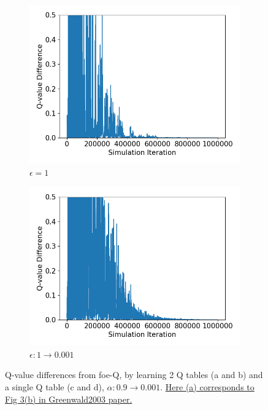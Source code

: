 \documentclass[10pt]{article}
\begin{document}
\begin{figure}[H]
\begin{subfigure}[b]{0.245\linewidth}
  \centering
  \includegraphics[width=\linewidth]{../figs/Qdifference_11.png}
      \caption{$\epsilon=1$}
  \label{fig:foeQ_1Q_1}
  \end{subfigure}
  \begin{subfigure}[b]{0.245\linewidth}
  \centering
  \includegraphics[width=\linewidth]{../figs/Qdifference_7.png}
      \caption{$\epsilon:1\rightarrow0.001$}
  \label{fig:foeQ_1Q_0001}
  \end{subfigure}
  \caption{Q-value differences from foe-Q, by learning 2 Q tables (a and b) and a single Q table (c and d), $\alpha:0.9\rightarrow0.001$. \ul{Here (a) corresponds to Fig 3(b) in Greenwald2003 paper.}\cite{GreenwaldCorrelatedQLearning2003}}
  \label{fig:foeQ}
\end{figure}
\end{document}
